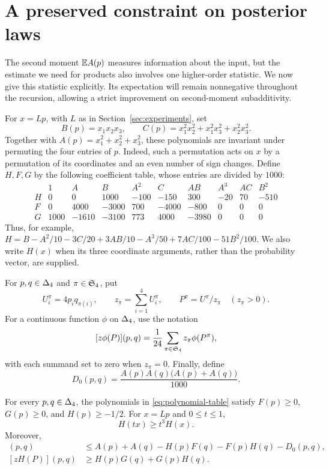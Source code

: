 \section{A preserved constraint on posterior laws}\label{sec:cone}

The second moment $\mathbb E A(p)$ measures information about the input, but the
estimate we need for products also involves one higher-order statistic.
We now give this statistic explicitly. Its expectation will remain
nonnegative throughout the recursion, allowing a strict improvement on
second-moment subadditivity.

For $x=Lp$, with $L$ as in Section~\ref{sec:experiments}, set
\[
 B(p)=x_1x_2x_3,\qquad
 C(p)=x_1^2x_2^2+x_1^2x_3^2+x_2^2x_3^2.
\]
Together with $A(p)=x_1^2+x_2^2+x_3^2$, these polynomials are invariant under
permuting the four entries of $p$. Indeed, such a permutation acts on $x$
by a permutation of its coordinates and an even number of sign changes.
Define $H,F,G$ by the following coefficient table, whose entries are divided
by $1000$:
\begin{equation}\label{eq:polynomial-table}
\begin{array}{c|rrrrrrrrr}
 &1&A&B&A^2&C&AB&A^3&AC&B^2\\ \hline
 H&0&0&1000&-100&-150&300&-20&70&-510\\
 F&0&4000&-3000&700&-4000&-800&0&0&0\\
 G&1000&-1610&-3100&773&4000&-3980&0&0&0
\end{array}
\end{equation}
Thus, for example, $H=B-A^2/10-3C/20+3AB/10-A^3/50
+7AC/100-51B^2/100$. We also write $H(x)$ when its three coordinate
arguments, rather than the probability vector, are supplied.

For $p,q\in\Delta_4$ and $\pi\in\mathfrak S_4$, put
\[
 U_i^{\pi}=4p_iq_{\pi(i)},\qquad
 z_\pi=\sum_{i=1}^4 U_i^{\pi},\qquad
 P^{\pi}=U^{\pi}/z_\pi\quad(z_\pi>0).
\]
For a continuous function $\phi$ on $\Delta_4$, use the notation
\begin{equation}\label{eq:permutation-average}
 [z\phi(P)](p,q)=\frac1{24}\sum_{\pi\in\mathfrak S_4}
                 z_\pi\phi(P^{\pi}),
\end{equation}
with each summand set to zero when $z_\pi=0$. Finally, define
\begin{equation}\label{eq:cubic-saving}
 D_0(p,q)=\frac{A(p)A(q)\bigl(A(p)+A(q)\bigr)}{1000}.
\end{equation}

\begin{proposition}\label{prop:polynomial-inequalities}
For every $p,q\in\Delta_4$, the polynomials in
\eqref{eq:polynomial-table} satisfy $F(p)\geq0$, $G(p)\geq0$, and
$H(p)\geq-1/2$. For $x=Lp$ and $0\leq t\leq1$,
\begin{equation}\label{eq:H-scaling}
 H(tx)\geq t^3H(x).
\end{equation}
Moreover,
\begin{align}
 [zA(P)](p,q)
 &\leq A(p)+A(q)-H(p)F(q)-F(p)H(q)-D_0(p,q),
 \label{eq:A-product}\\
 [zH(P)](p,q)
 &\geq H(p)G(q)+G(p)H(q).
 \label{eq:H-product}
\end{align}
\end{proposition}


